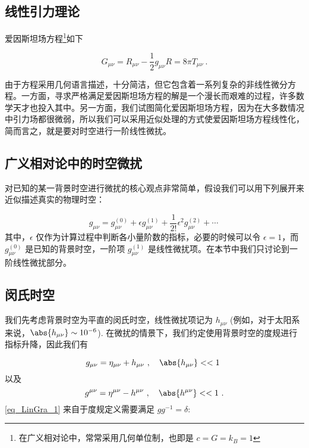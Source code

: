 
\begin{issues}
\issueMissDepend
\issueDraft
\end{issues}



\subsection{线性引力理论}
爱因斯坦场方程\footnote{在广义相对论中，常常采用几何单位制，也即是 $c=G=k_B=1$}如下

\begin{equation}\label{eq_LinGra_2}
G_{\mu \nu} = R_{\mu \nu} - \frac{1}{2}g_{\mu\nu}R = 8\pi T_{\mu\nu}~.
\end{equation}

由于方程采用几何语言描述，十分简洁，但它包含着一系列复杂的非线性微分方程。一方面，寻求严格满足爱因斯坦场方程的解是一个漫长而艰难的过程，许多数学天才也投入其中。另一方面，我们试图简化爱因斯坦场方程，因为在大多数情况中引力场都很微弱，所以我们可以采用近似处理的方式使爱因斯坦场方程线性化，简而言之，就是要对时空进行一阶线性微扰。


\subsection{广义相对论中的时空微扰}

对已知的某一背景时空进行微扰的核心观点非常简单，假设我们可以用下列展开来近似描述真实的物理时空：

\begin{equation}
g_{\mu\nu}=g^{(0)}_{\mu\nu} + \epsilon g^{(1)}_{\mu\nu} + \frac{1}{2!}\epsilon^2 g^{(2)}_{\mu\nu}+\cdots~
\end{equation}
其中，$\epsilon $ 仅作为计算过程中判断各小量阶数的指标，必要的时候可以令 $\epsilon = 1 $，而 $g^{(0)}_{\mu\nu} $ 是已知的背景时空，一阶项 $g^{(1)}_{\mu\nu}$ 是线性微扰项。在本节中我们只讨论到一阶线性微扰部分。


\subsection{闵氏时空}

我们先考虑背景时空为平直的闵氏时空，线性微扰项记为 $h_{\mu\nu}$ (例如，对于太阳系来说，$\abs{h_{\mu\nu}} \sim 10^{-6}$). 在微扰的情景下，我们约定使用背景时空的度规进行指标升降，因此我们有

\begin{equation}
g_{\mu\nu} = \eta_{\mu\nu} + h_{\mu\nu}~, \quad \abs{h_{\mu\nu}}<<1 ~
\end{equation}
以及
\begin{equation}\label{eq_LinGra_1}
g^{\mu\nu} = \eta^{\mu\nu} - h^{\mu\nu}~, \quad \abs{h^{\mu\nu}}<<1 ~.
\end{equation}
\autoref{eq_LinGra_1} 来自于度规定义需要满足 $gg^{-1}=\delta$:


